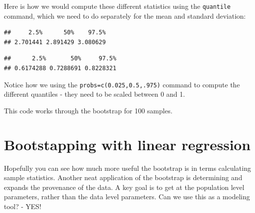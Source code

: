 \documentclass[
]{book}
\newenvironment{Shaded}{\begin{snugshade}}{\end{snugshade}}
\newcommand{\AttributeTok}[1]{\textcolor[rgb]{0.77,0.63,0.00}{#1}}
\newcommand{\DecValTok}[1]{\textcolor[rgb]{0.00,0.00,0.81}{#1}}
\newcommand{\FloatTok}[1]{\textcolor[rgb]{0.00,0.00,0.81}{#1}}
\newcommand{\FunctionTok}[1]{\textcolor[rgb]{0.00,0.00,0.00}{#1}}
\newcommand{\NormalTok}[1]{#1}
\newcommand{\SpecialCharTok}[1]{\textcolor[rgb]{0.00,0.00,0.00}{#1}}
\theoremstyle{definition}
\theoremstyle{definition}
\theoremstyle{definition}
\theoremstyle{remark}
\begin{document}
Here is how we would compute these different statistics using the \texttt{quantile} command, which we need to do separately for the mean and standard deviation:

\begin{Shaded}
\end{Shaded}

\begin{verbatim}
##     2.5%      50%    97.5% 
## 2.701441 2.891429 3.080629
\end{verbatim}

\begin{Shaded}
\end{Shaded}

\begin{verbatim}
##      2.5%       50%     97.5% 
## 0.6174288 0.7288691 0.8228321
\end{verbatim}

Notice how we using the \texttt{probs=c(0.025,0.5,.975)} command to compute the different quantiles - they need to be scaled between 0 and 1.

This code works through the bootstrap for 100 samples.

\hypertarget{bootstapping-with-linear-regression}{%
\section{Bootstapping with linear regression}\label{bootstapping-with-linear-regression}}

Hopefully you can see how much more useful the bootstrap is in terms calculating sample statistics. Another neat application of the bootstrap is determining and expands the provenance of the data. A key goal is to get at the population level parameters, rather than the data level parameters. Can we use this as a modeling tool? - YES!
\end{document}
